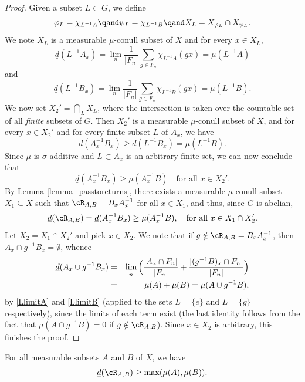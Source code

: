 \begin{proof}
Given a subset $L \subset G$, we define
\[
\varphi_L = \chi_{L^{-1}A} \qand \psi_L = \chi_{L^{-1}B} \qand X_L = X_{\varphi_L} \cap X_{\psi_L}.
\]
We note $X_L$ is a measurable $\mu$-conull subset of $X$ and for every $x \in X_L$,
\begin{equation}
\label{LlimitA}
\underline{d}(L^{-1}A_x) = \lim_n \frac{1}{|F_n|} \sum_{g \in F_n} \chi_{L^{-1}A}(gx) = \mu(L^{-1}A)
\end{equation}
and
\begin{equation}
\label{LlimitB}
\underline{d}(L^{-1}B_x) = \lim_n \frac{1}{|F_n|} \sum_{g \in F_n} \chi_{L^{-1}B}(gx) = \mu(L^{-1}B).
\end{equation}
We now set $X_2' = \bigcap_{L} X_L$, where the intersection is taken over the countable set of all \emph{finite} subsets of $G$. Then
$X_2'$ is a measurable $\mu$-conull subset of $X$, and for every $x \in X_2'$ and for every finite subset $L$ of $A_x$, we have
\[
\underline{d}(A_x^{-1}B_x) \geq \underline{d}(L^{-1}B_x) = \mu(L^{-1}B).
\]
Since $\mu$ is $\sigma$-additive and $L \subset A_x$ is an arbitrary finite set, we can now conclude that
\[
\underline{d}(A_x^{-1}B_x) \geq \mu(A_x^{-1}B) \quad \textrm{for all $x \in X_2'$}.
\]
By Lemma \ref{lemma_passtoreturns}, there exists a measurable $\mu$-conull subset $X_1 \subseteq X$ such that
$\cR_{A,B} = B_x A_x^{-1}$ for all $x \in X_1$, and thus, since $G$ is abelian,
\[
\underline{d}(\cR_{A,B}) = \underline{d}(A_x^{-1}B_x) \geq \mu(A_x^{-1}B), \quad \textrm{for all $x \in X_1 \cap X_2'$}.
\]
Let $X_2 = X_1 \cap X_2'$ and pick $x \in X_2$. We note that if $g \notin \cR_{A,B} = B_x A_x^{-1}$, then $A_x \cap g^{-1}B_x = \emptyset$,
whence
\begin{eqnarray*}
\underline{d}(A_x \cup g^{-1}B_x)
&=&
\varliminf_n \Big( \frac{|A_x \cap F_n|}{|F_n|} + \frac{|(g^{-1}B)_x \cap F_n|}{|F_n|} \Big) \\
&=&
\mu(A) + \mu(B) = \mu(A \cup g^{-1}B),
\end{eqnarray*}
by \eqref{LlimitA} and \eqref{LlimitB} (applied to the sets $L = \{e\}$ and $L = \{g\}$ respectively), since the limits of each term exist
(the last identity follows from the fact that $\mu(A \cap g^{-1}B) = 0$ if $g \notin \cR_{A,B}$). Since $x \in X_2$ is arbitrary, this finishes the proof.
\end{proof}

\begin{corollary}
\label{cor_max}
For all measurable subsets $A$ and $B$ of $X$, we have
\[
\underline{d}(\cR_{A,B}) \geq \max(\mu(A),\mu(B)).
\]
\end{corollary}

